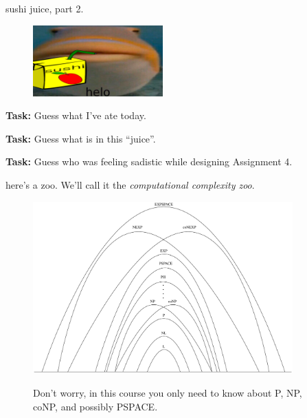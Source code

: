 \documentclass{beamer}
\begin{document}
\begin{frame}{sushi juice, part 2.}
\begin{figure}[h]
\centering
\includegraphics[width=5cm]{img/helo_fish_sushi.jpg}
\end{figure}

\textbf{Task:} Guess what I've ate today.

\pause

\textbf{Task:} Guess what is in this ``juice''.

\pause

\textbf{Task:} Guess who was feeling sadistic while designing Assignment 4.

\end{frame}


\begin{frame}{here's a zoo.}
We'll call it the \textit{computational complexity zoo}.

\begin{figure}[h]
\centering
\includegraphics[width=10cm]{img/zoo.png}

Don't worry, in this course you only need to know about P, NP, coNP, and possibly PSPACE.
\end{figure}
\end{frame}
\end{document}
